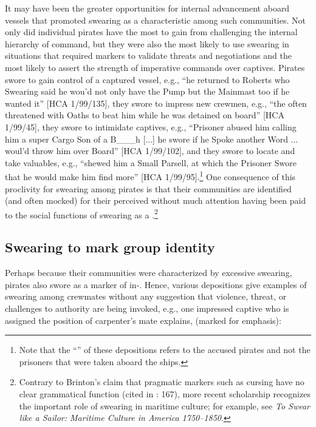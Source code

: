 It may have been the greater opportunities for internal advancement aboard  vessels that promoted swearing as a characteristic  among such communities. Not only did individual pirates have the most to gain from challenging the internal hierarchy of command, but they were also the most likely to use swearing in situations that required  markers to validate threats and negotiations and the most likely to assert the strength of imperative commands over captives. Pirates swore to gain control of a captured vessel, e.g., “he returned to Roberts who Swearing said he wou’d not only have the Pump but the Mainmast too if he wanted it” [HCA 1/99/135], they swore to impress new crewmen, e.g., “the  often threatened with Oaths to beat him while he was detained on board” [HCA 1/99/45], they swore to intimidate captives, e.g., “Prisoner abused him calling him a super Cargo Son of a B\_\_\_h [...] he swore if he Spoke another Word ... woul’d throw him over Board” [HCA 1/99/102], and they swore to locate and take valuables, e.g., “shewed him a Small Parsell, at which the Prisoner Swore that he would make him find more” [HCA 1/99/95].\footnote{Note that the “” of these depositions refers to the accused pirates and not the prisoners that were taken aboard the  ships.}  One consequence of this proclivity for swearing among pirates is that their communities are identified (and often mocked) for their perceived  without much attention having been paid to the social functions of swearing as a .\footnote{Contrary to Brinton’s claim that pragmatic markers such as cursing have no clear grammatical function (cited in \citealt{ClaridgeArnovick2010}: 167), more recent scholarship recognizes the important role of swearing in maritime culture; for example, see  \textit{To Swear like a Sailor: Maritime Culture in America {1750}–1850}.} 

\subsection{{Swearing to mark group identity}}%

Perhaps because their communities were characterized by excessive swearing, pirates also swore as a marker of in-. Hence, various depositions give examples of swearing among crewmates without any suggestion that violence, threat, or challenges to authority are being invoked, e.g., one impressed captive who is assigned the position of carpenter’s mate explains, (marked for emphasis): 

